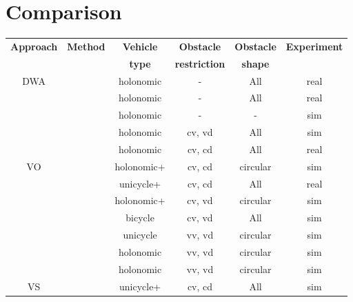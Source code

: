 \newpage
\section{Comparison}%
\label{sec:comparision}


\setlength{\belowrulesep}{0ex}
\setlength{\aboverulesep}{0ex}
\begin{table}[htpb]
    \centering
\label{tab:comparision_table}
    \begin{tabular}{|c|c||c|c|c|c|}\toprule
        \textbf{Approach} & \textbf{Method} & \textbf{Vehicle} & \textbf{Obstacle} & \textbf{Obstacle} & \textbf{Experiment} \\
                          &    & \textbf{type} & \textbf{restriction} & \textbf{shape} & \\\toprule
        \multirow{5}{*}{DWA}&\cite{fox1997dynamic} & holonomic & \-- & All & real \\\cmidrule{2-6}
                            &\cite{brock1999high}  & holonomic & \-- & All & real \\\cmidrule{2-6}
                            &\cite{ogren2005convergent}  & holonomic & \-- & \-- & sim \\\cmidrule{2-6}
                            &\cite{seder2007dynamic}   & holonomic & cv, vd & All & sim \\\cmidrule{2-6}
                            &\cite{chung2009safe}  & holonomic & cv, cd & All & real \\\midrule
        \multirow{6}{*}{VO} &\cite{fiorini1998motion}  & holonomic+ & cv, cd & circular & sim \\\cmidrule{2-6}
                            &\cite{prassler2001robotics}  & unicycle+ & cv, cd & All & real \\\cmidrule{2-6}
                            &\cite{shiller2001motion}  & holonomic+ & cv, vd & circular & sim \\\cmidrule{2-6}
                            &\cite{large2005navigation}  & bicycle & cv, vd & All & sim \\\cmidrule{2-6}
                            &\cite{belkhouche2009reactive}  & unicycle & vv, vd & circular & sim \\\cmidrule{2-6}
                            &\cite{van2008reciprocal}  & holonomic & vv, vd & circular & sim \\\cmidrule{2-6}
                            &\cite{van2011reciprocal}  & holonomic & vv, vd & circular & sim \\\midrule
        \multirow{1}{*}{VS} &\cite{owen2005motion}\cite{owen2006a}  & unicycle+ & cv, cd & All & sim \\\midrule

\end{tabular}
\end{table}
